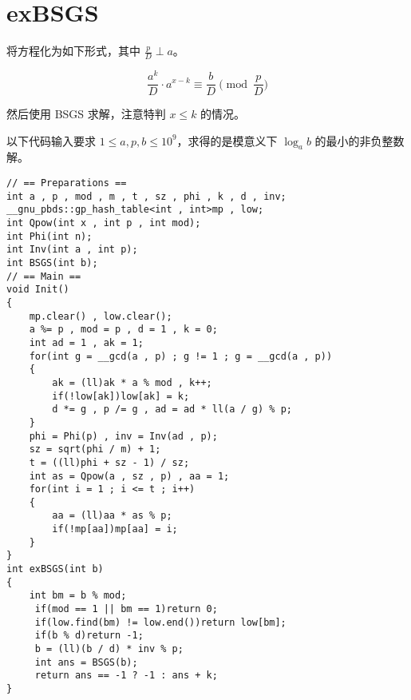 \section{exBSGS}

将方程化为如下形式，其中 $\frac{p}{D} \perp a$。

$$\frac{a^k}{D}\cdot a^{x-k}\equiv\frac{b}{D} \pmod{\frac{p}{D}}$$

然后使用 BSGS 求解，注意特判 $x \le k$ 的情况。

以下代码输入要求 $1\le a,p,b\le10^9$，求得的是模意义下 $\log_{a}{b}$ 的最小的非负整数解。

\begin{verbatim}
// == Preparations ==
int a , p , mod , m , t , sz , phi , k , d , inv; 
__gnu_pbds::gp_hash_table<int , int>mp , low;
int Qpow(int x , int p , int mod);
int Phi(int n);
int Inv(int a , int p);
int BSGS(int b);
// == Main ==
void Init()
{
    mp.clear() , low.clear();
    a %= p , mod = p , d = 1 , k = 0; 
    int ad = 1 , ak = 1; 
    for(int g = __gcd(a , p) ; g != 1 ; g = __gcd(a , p))
    {
        ak = (ll)ak * a % mod , k++;
        if(!low[ak])low[ak] = k;
        d *= g , p /= g , ad = ad * ll(a / g) % p;
    }
    phi = Phi(p) , inv = Inv(ad , p);
    sz = sqrt(phi / m) + 1;
    t = ((ll)phi + sz - 1) / sz;
    int as = Qpow(a , sz , p) , aa = 1;
    for(int i = 1 ; i <= t ; i++)
    {
        aa = (ll)aa * as % p;
        if(!mp[aa])mp[aa] = i;
    }
}
int exBSGS(int b)
{
    int bm = b % mod;
     if(mod == 1 || bm == 1)return 0;    
     if(low.find(bm) != low.end())return low[bm];
     if(b % d)return -1;
     b = (ll)(b / d) * inv % p;
     int ans = BSGS(b);
     return ans == -1 ? -1 : ans + k;
}
\end{verbatim}